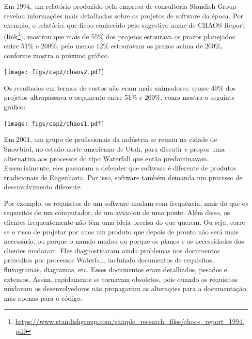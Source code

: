 \documentclass[
  11pt,
  twoside]{book}
\DeclareRobustCommand{\href}[2]{#2\footnote{\url{#1}}}
\let\origfigure\figure
\let\endorigfigure\endfigure
\renewenvironment{figure}[1][2] {
    \expandafter\origfigure\expandafter[!h]
} {
    \endorigfigure
}
\begin{document}
 Em 1994, um relatório produzido pela empresa de
consultoria Standish Group revelou informações mais detalhadas sobre os
projetos de software da época. Por exemplo, o relatório, que ficou
conhecido pelo sugestivo nome de CHAOS Report
(\href{https://www.standishgroup.com/sample_research_files/chaos_report_1994.pdf}{link}),
mostrou que mais de 55\% dos projetos estourava os prazos planejados
entre 51\% e 200\%; pelo menos 12\% estouravam os prazos acima de 200\%,
conforme mostra o próximo gráfico.

\begin{figure}
\centering
\texttt{[image: figs/cap2/chaos2.pdf]}
\caption{CHAOS Report (1994): percentual de projetos que estourava seus
\textbf{prazos} (para cada faixa de estouro).}
\end{figure}

Os resultados em termos de custos não eram mais animadores: quase 40\%
dos projetos ultrapassava o orçamento entre 51\% e 200\%, como mostra o
seguinte gráfico:

\begin{figure}
\centering
\texttt{[image: figs/cap2/chaos1.pdf]}
\caption{CHAOS Report (1994): percentual de projetos que estourava seus
\textbf{orçamentos} (para cada faixa de estouro).}
\end{figure}

Em 2001, um grupo de profissionais da indústria se reuniu na cidade de
Snowbird, no estado norte-americano de Utah, para discutir e propor uma
alternativa aos processos do tipo Waterfall que então predominavam.
Essencialmente, eles passaram a defender que software é diferente de
produtos tradicionais de Engenharia. Por isso, software também demanda
um processo de desenvolvimento diferente.

Por exemplo, os requisitos de um software mudam com frequência, mais do
que os requisitos de um computador, de um avião ou de uma ponte. Além
disso, os clientes frequentemente não têm uma ideia precisa do que
querem. Ou seja, corre-se o risco de projetar por anos um produto que
depois de pronto não será mais necessário, ou porque o mundo mudou ou
porque os planos e as necessidades dos clientes mudaram. Eles
diagnosticaram ainda problemas nos documentos prescritos por processos
Waterfall, incluindo documentos de requisitos, fluxogramas, diagramas,
etc. Esses documentos eram detalhados, pesados e extensos. Assim,
rapidamente se tornavam obsoletos, pois quando os requisitos mudavam os
desenvolvedores não propagavam as alterações para a documentação, mas
apenas para o código.
\end{document}
